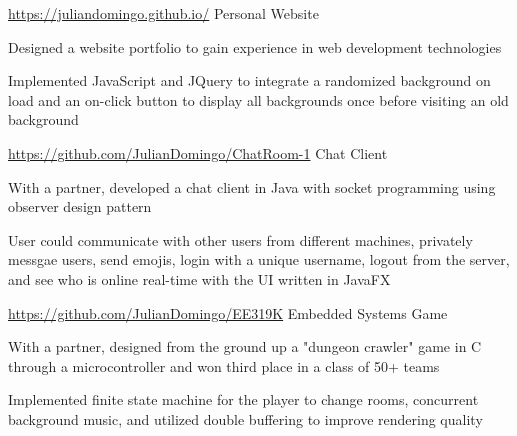 \begin{cventries}
  \cventry
    {\url{https://juliandomingo.github.io/}}
    {Personal Website}
    {}
    {}
    {
      \begin{cvitems}
        \item Designed a website portfolio to gain experience in web development technologies
        \item Implemented JavaScript and JQuery to integrate a randomized background on load and an on-click button to display all backgrounds once before visiting an old background
      \end{cvitems}
    }
  \cventry
    {\url{https://github.com/JulianDomingo/ChatRoom-1}}
    {Chat Client}
    {}
    {}
    {
      \begin{cvitems}
        \item {With a partner, developed a chat client in Java with socket programming using observer design pattern}
        \item {User  could communicate with other users from different machines, privately messgae users, send emojis, login with a unique username, logout from the server, and see who is online real-time with the UI written in JavaFX}
      \end{cvitems}
    }
  \cventry
    {\url{https://github.com/JulianDomingo/EE319K}}
    {Embedded Systems Game}
    {}
    {}
    {
      \begin{cvitems}
        \item {With a partner, designed from the ground up a "dungeon crawler" game in C through a microcontroller and won third place in a class of 50+ teams}
        \item {Implemented finite state machine for the player to change rooms, concurrent background music, and utilized double buffering to improve rendering quality}
      \end{cvitems}
    }
\end{cventries}
